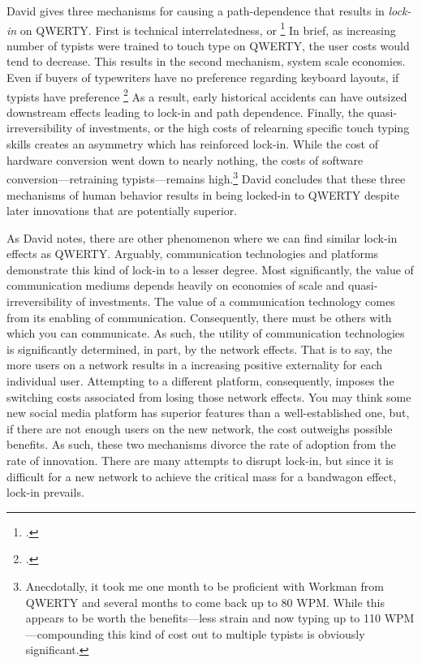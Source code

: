 \documentclass[letterpaper,notitlepage,12pt]{article}
\begin{document}
David gives three mechanisms for causing a path-dependence that results in
\textit{lock-in} on QWERTY.
First is technical interrelatedness, or \footcite[p. 334]{david_clio_1985}
In brief, as increasing number of typists were trained to touch type on QWERTY,
the user costs would tend to decrease.
This results in the second mechanism, system scale economies.
Even if buyers of typewriters have no preference regarding keyboard layouts, if
typists have preference \footcite[p. 335]{david_clio_1985}
As a result, early historical accidents can have outsized downstream effects
leading to lock-in and path dependence.
Finally, the quasi-irreversibility of investments, or the high costs of
relearning specific touch typing skills creates an asymmetry which has
reinforced lock-in.
While the cost of hardware conversion went down to nearly nothing, the costs of 
software conversion---retraining typists---remains high.\footnote{Anecdotally,
  it took me one month to be proficient with Workman from QWERTY and several
  months to come back up to 80 WPM. While this appears to be worth the
  benefits---less strain and now typing up to 110 WPM---compounding this kind of
cost out to multiple typists is obviously significant.}
David concludes that these three mechanisms of human behavior results in being
locked-in to QWERTY despite later innovations that are potentially superior.

As David notes, there are other phenomenon where we can find similar lock-in
effects as QWERTY.
Arguably, communication technologies and platforms demonstrate this kind of
lock-in to a lesser degree.
Most significantly, the value of communication mediums depends heavily on
economies of scale and quasi-irreversibility of investments.
The value of a communication technology comes from its enabling of communication.
Consequently, there must be others with which you can communicate.
As such, the utility of communication technologies is significantly determined,
in part, by the network effects.
That is to say, the more users on a network results in a increasing positive
externality for each individual user.
Attempting to a different platform, consequently, imposes the switching costs
associated from losing those network effects.
You may think some new social media platform has superior features than a
well-established one, but, if there are not enough users on the new network, the
cost outweighs possible benefits.
As such, these two mechanisms divorce the rate of adoption from the rate of
innovation.
There are many attempts to disrupt lock-in, but since it is difficult for a new
network to achieve the critical mass for a bandwagon effect, lock-in prevails.
\end{document}
